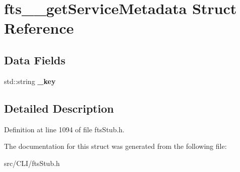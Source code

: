 \section{fts\_\-\_\-getServiceMetadata Struct Reference}
\label{structfts____getServiceMetadata}
\subsection*{Data Fields}
\begin{DoxyCompactItemize}
\item 
std::string {\bfseries \_\-key}\label{structfts____getServiceMetadata_a4cfe5930d6845062ef2493ac9631f36d}

\end{DoxyCompactItemize}


\subsection{Detailed Description}


Definition at line 1094 of file ftsStub.h.



The documentation for this struct was generated from the following file:\begin{DoxyCompactItemize}
\item 
src/CLI/ftsStub.h\end{DoxyCompactItemize}

